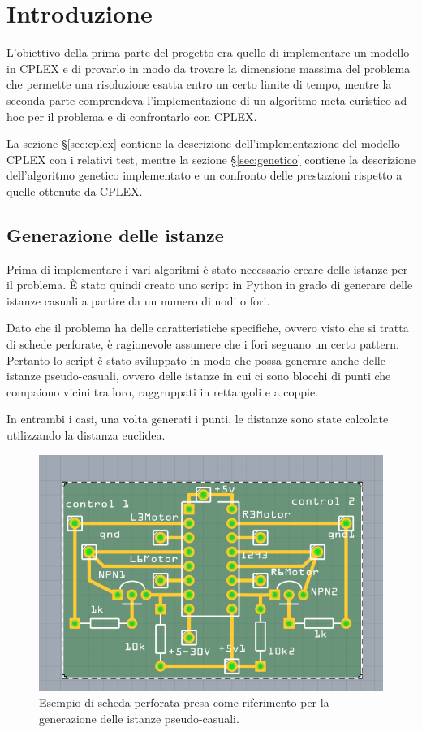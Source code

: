 
\section{Introduzione}

L'obiettivo della prima parte del progetto era quello di implementare un modello in CPLEX e di provarlo in modo da trovare la dimensione massima del problema che permette una risoluzione esatta entro un certo limite di tempo, mentre la seconda parte comprendeva l'implementazione di un algoritmo meta-euristico ad-hoc per il problema e di confrontarlo con CPLEX.

La sezione §\ref{sec:cplex} contiene la descrizione dell'implementazione del modello CPLEX con i relativi test, mentre la sezione §\ref{sec:genetico} contiene la descrizione dell'algoritmo genetico implementato e un confronto delle prestazioni rispetto a quelle ottenute da CPLEX.

\subsection{Generazione delle istanze}

Prima di implementare i vari algoritmi è stato necessario creare delle istanze per il problema.
\`E stato quindi creato uno script in Python in grado di generare delle istanze casuali a partire da un numero di nodi o fori.

Dato che il problema ha delle caratteristiche specifiche, ovvero visto che si tratta di schede perforate, è ragionevole assumere che i fori seguano un certo pattern.
Pertanto lo script è stato sviluppato in modo che possa generare anche delle istanze pseudo-casuali, ovvero delle istanze in cui ci sono blocchi di punti che compaiono vicini tra loro, raggruppati in rettangoli e a coppie.

In entrambi i casi, una volta generati i punti, le distanze sono state calcolate utilizzando la distanza euclidea.

\begin{figure}[htbp]
	\centering
	\includegraphics[width=.5\textwidth]{immagini/scheda.png}
	\caption{Esempio di scheda perforata presa come riferimento per la generazione delle istanze pseudo-casuali.}
\end{figure}